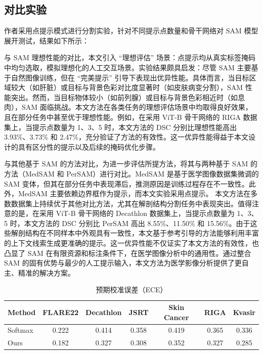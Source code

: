\documentclass[12pt,a4paper]{article}
\begin{document}
	\subsection{对比实验}
	作者采用点提示模式进行分割实验，针对不同提示点数量和骨干网络对 SAM 模型展开测试，结果如下所示：
	\begin{figure}[H]
		\centering
	\end{figure}
	
	与 SAM 理想性能的对比，本文引入 “理想评估” 场景：点提示均从真实标签掩码中均匀选取，模拟理想化的人工交互场景。实验结果颇具启发：尽管 SAM 主要基于自然图像训练，但在 “完美提示” 引导下表现出优异性能。具体而言，当目标区域较大（如肝脏）或目标与背景色彩对比度显著时（如皮肤病变分割），SAM 性能突出。然而，当目标物体较小（如前列腺）或目标与背景色彩相近时（如息肉），SAM 面临挑战。本文方法在各类任务的理想评估场景中均取得良好效果，且在部分任务中甚至优于理想性能。例如，在采用 ViT-B 骨干网络的 RIGA 数据集上，当提示点数量为 1、3、5 时，本文方法的 DSC 分别比理想性能高出 3.93\%、3.73\% 和 2.47\%，充分验证了方法的有效性。这一优异性能得益于本文设计的具有区分性的提示以及后续的掩码优化步骤。\par 
	与其他基于 SAM 的方法对比，为进一步评估所提方法，将其与两种基于 SAM 的方法（MedSAM 和 PerSAM）进行对比。MedSAM 是基于医学图像数据集微调的 SAM 变体，但其在部分任务中表现滞后，推测原因是训练过程存在不一致性。此外，MedSAM 主要依赖边界框作为提示，而本文实验采用点提示。
	本文方法在多数数据集上持续优于其他对比方法，尤其在解剖结构分割任务中表现突出。值得注意的是，在采用 ViT-B 骨干网络的 Decathlon 数据集上，当提示点数量为 1、3、5 时，本文方法的 DSC 分别比 PerSAM 高出 8.55\%、11.50\% 和 15.56\%。由于这些解剖结构在不同样本中外观具有一致性，本文基于参考引导的方法能够利用丰富的上下文线索生成更准确的提示。这一优异性能不仅证实了本文方法的有效性，也凸显了 SAM 在有限资源和标注条件下，在医学图像分析中的通用性。通过整合 SAM 的固有优势与最少的人工提示输入，本文方法为医学影像分析提供了更自主、精准的解决方案。
	\begin{table}[htbp]
		\centering
		\setlength{\tabcolsep}{6pt}
		\begin{tabular}{lcccccc}
			\hline
			Method & FLARE22 & Decathlon & JSRT & Skin Cancer & RIGA & Kvasir \\
			\hline
			Softmax & 0.222 & 0.414 & 0.358 & 0.419 & 0.365 & 0.336 \\
			Ours & 0.182 & 0.327 & 0.308 & 0.352 & 0.327 & 0.285 \\
			\hline
		\end{tabular}
		\caption{预期校准误差（ECE）}
		\label{tab:2}
	\end{table}
\end{document}
